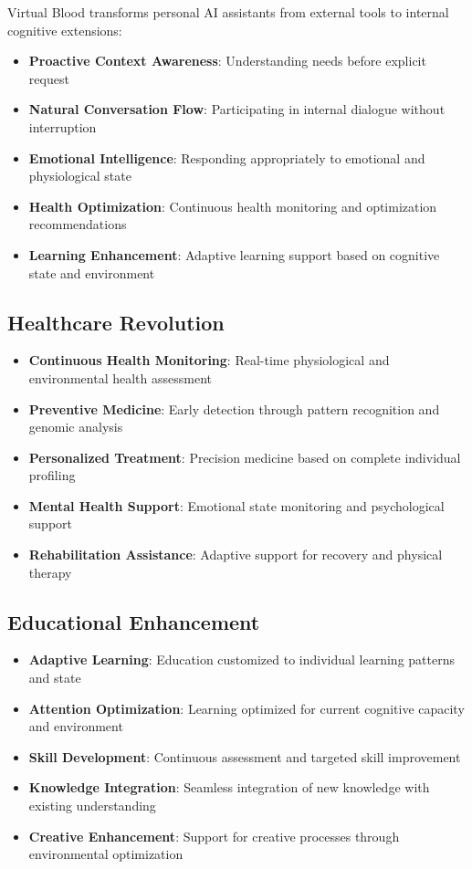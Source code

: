 \documentclass[12pt,a4paper]{article}
\begin{document}
Virtual Blood transforms personal AI assistants from external tools to internal cognitive extensions:

\begin{itemize}
\item \textbf{Proactive Context Awareness}: Understanding needs before explicit request
\item \textbf{Natural Conversation Flow}: Participating in internal dialogue without interruption
\item \textbf{Emotional Intelligence}: Responding appropriately to emotional and physiological state
\item \textbf{Health Optimization}: Continuous health monitoring and optimization recommendations
\item \textbf{Learning Enhancement}: Adaptive learning support based on cognitive state and environment
\end{itemize}

\subsection{Healthcare Revolution}

\begin{itemize}
\item \textbf{Continuous Health Monitoring}: Real-time physiological and environmental health assessment
\item \textbf{Preventive Medicine}: Early detection through pattern recognition and genomic analysis
\item \textbf{Personalized Treatment}: Precision medicine based on complete individual profiling
\item \textbf{Mental Health Support}: Emotional state monitoring and psychological support
\item \textbf{Rehabilitation Assistance}: Adaptive support for recovery and physical therapy
\end{itemize}

\subsection{Educational Enhancement}

\begin{itemize}
\item \textbf{Adaptive Learning}: Education customized to individual learning patterns and state
\item \textbf{Attention Optimization}: Learning optimized for current cognitive capacity and environment
\item \textbf{Skill Development}: Continuous assessment and targeted skill improvement
\item \textbf{Knowledge Integration}: Seamless integration of new knowledge with existing understanding
\item \textbf{Creative Enhancement}: Support for creative processes through environmental optimization
\end{itemize}
\end{document}
